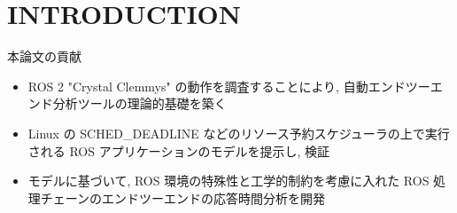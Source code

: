 
\section{INTRODUCTION}
\label{sec: introduction}


\begin{frame}{本論文の貢献}
    \begin{itemize}
        \item ROS 2 "Crystal Clemmys" の動作を調査することにより, 自動エンドツーエンド分析ツールの理論的基礎を築く
        \item Linux の SCHED\_DEADLINE などのリソース予約スケジューラの上で実行される ROS アプリケーションのモデルを提示し, 検証
        \item モデルに基づいて, ROS 環境の特殊性と工学的制約を考慮に入れた ROS 処理チェーンのエンドツーエンドの応答時間分析を開発
    \end{itemize}
\end{frame}
